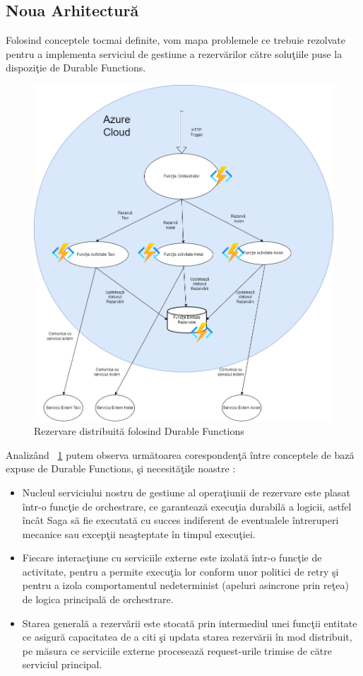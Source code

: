 \subsection{Noua Arhitectură}
\par Folosind conceptele tocmai definite, vom mapa problemele ce trebuie rezolvate pentru a implementa serviciul de gestiune a rezervărilor către soluţiile puse la dispoziţie de Durable Functions. 
 \begin{figure}[h]
\centering
        \includegraphics[width=1\textwidth]{images/durable_functions_arhitecture}
			 \caption{Rezervare distribuită folosind Durable Functions}
			 \label{fig:durable-functions-booking-arhitecture}
\end{figure}
 \par Analizând ~\ref{fig:durable-functions-booking-arhitecture} putem observa următoarea corespondenţă între conceptele de bază expuse de Durable Functions, şi necesităţile noastre : 
 \begin{itemize}
 \item Nucleul serviciului nostru de gestiune al operaţiunii de rezervare este plasat într-o funcţie de orchestrare, ce garantează execuţia durabilă a logicii, astfel încât Saga să fie executată cu succes indiferent de eventualele întreruperi mecanice sau excepţii neaşteptate în timpul execuţiei.
 \item Fiecare interacţiune cu serviciile externe este izolată într-o funcţie de activitate, pentru a permite execuţia lor conform unor politici de retry şi pentru a izola comportamentul nedeterminist (apeluri asincrone prin reţea) de logica principală de orchestrare.
 \item Starea generală a rezervării este stocată prin intermediul unei funcţii entitate ce asigură capacitatea de a citi şi updata starea rezervării în mod distribuit, pe măsura ce serviciile externe procesează request-urile trimise de către serviciul principal.
 \end{itemize}
